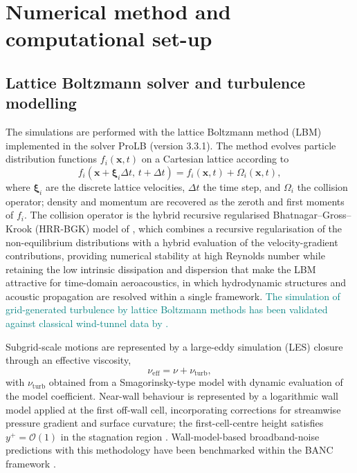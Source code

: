 \documentclass[lineno]{JFM-FLM_Au}
\begin{document}
\section{Numerical method and computational set-up}
\label{sec:method}

\subsection{Lattice Boltzmann solver and turbulence modelling}
\label{sec:method_solver}

The simulations are performed with the lattice Boltzmann method (LBM)
implemented in the solver ProLB (version 3.3.1). The method evolves
particle distribution functions $f_i(\boldsymbol{x},t)$ on a Cartesian
lattice according to
\begin{equation}
  f_i(\boldsymbol{x} + \boldsymbol{\xi}_i\Delta t,\, t + \Delta t)
  = f_i(\boldsymbol{x},t) + \Omega_i(\boldsymbol{x},t),
  \label{eq:lbm}
\end{equation}
where $\boldsymbol{\xi}_i$ are the discrete lattice velocities,
$\Delta t$ the time step, and $\Omega_i$ the collision operator;
density and momentum are recovered as the zeroth and first moments of
$f_i$. The collision operator is the hybrid recursive regularised
Bhatnagar--Gross--Krook (HRR-BGK) model of \citet{Jacob2018}, which
combines a recursive regularisation of the non-equilibrium distributions
with a hybrid evaluation of the velocity-gradient contributions, providing
numerical stability at high Reynolds number while retaining the low
intrinsic dissipation and dispersion that make the LBM attractive for
time-domain aeroacoustics, in which hydrodynamic structures and acoustic
propagation are resolved within a single framework. \textcolor{teal}{The simulation of
grid-generated turbulence by lattice Boltzmann methods has been validated
against classical wind-tunnel data by \citet{Djenidi2006}.}

Subgrid-scale motions are represented by a large-eddy simulation (LES)
closure through an effective viscosity,
\begin{equation}
  \nu_{\mathrm{eff}} = \nu + \nu_{\mathrm{turb}},
  \label{eq:visc}
\end{equation}
with $\nu_{\mathrm{turb}}$ obtained from a Smagorinsky-type model
\citep{Smagorinsky1963} with dynamic evaluation of the model coefficient.
Near-wall behaviour is represented by a logarithmic wall model applied at
the first off-wall cell, incorporating corrections for streamwise pressure
gradient and surface curvature; the first-cell-centre height satisfies
$y^+ = \mathcal{O}(1)$ in the stagnation region
. Wall-model-based broadband-noise predictions with this methodology have
    been benchmarked within the BANC framework \citep{Herr2015}.
\end{document}
